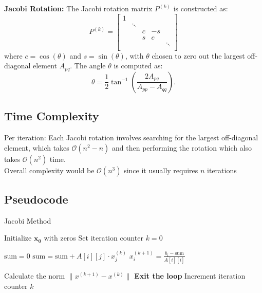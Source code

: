 \documentclass[final]{article}
\begin{document}
\textbf{Jacobi Rotation:}
The Jacobi rotation matrix $P^{(k)}$ is constructed as:
\[
P^{(k)} = \begin{bmatrix}
1 & & & & \\
& \ddots & & & \\
& & c & -s & \\
& & s & c & \\
& & & & \ddots \\
\end{bmatrix}
\]
where $c = \cos(\theta)$ and $s = \sin(\theta)$, with $\theta$ chosen to zero out the largest off-diagonal element $A_{pq}$. The angle $\theta$ is computed as:
\[
\theta = \frac{1}{2} \tan^{-1} \left( \frac{2A_{pq}}{A_{pp} - A_{qq}} \right).
\]

        \subsection{Time Complexity} 
        Per iteration: Each Jacobi rotation involves searching for the largest off-diagonal element, which takes $\mathcal{O}(n^2-n)$ and then performing the rotation which also takes $\mathcal{O}(n^2)$ time.\\
        Overall complexity would be $\mathcal{O}(n^3)$ since it usually requires $n$ iterations 
        \subsection{Pseudocode}
            \begin{algorithm}
            \caption{Jacobi Method}
            \begin{algorithmic}
                \State Initialize $\mathbf{x_0}$ with zeros
                \State Set iteration counter $ k = 0 $

                \Repeat
                    \State $ \text{sum} = 0 $
                \State $ \text{sum} = \text{sum} + A[i][j] \cdot x_j^{(k)} $
                \EndFor
        \State $ x_i^{(k+1)} = \frac{b_i - \text{sum}}{A[i][i]} $
    \EndFor

    \State Calculate the norm $ \| x^{(k+1)} - x^{(k)} \| $
        \State \textbf{Exit the loop}
    \EndIf
    \State Increment iteration counter $ k $

        \end{algorithmic}
    \end{algorithm}
\end{document}
